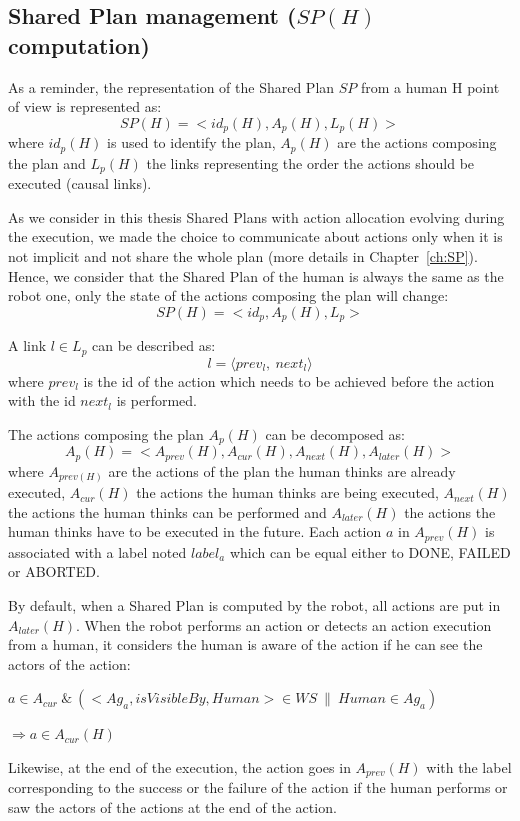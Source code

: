 \documentclass[english,a4paper,11pt,twoside]{StyleThese}
\begin{document}
\subsection{Shared Plan management ($SP(H)$ computation)}

As a reminder, the representation of the Shared Plan $SP$ from a human H point of view is represented as:
$$SP(H) = <id_p(H), A_p(H), L_p(H)>$$
where $id_p(H)$ is used to identify the plan, $A_p(H)$ are the actions composing the plan and $L_p(H)$ the links representing the order the actions should be executed (causal links).

As we consider in this thesis Shared Plans with action allocation evolving during the execution, we made the choice to communicate about actions only when it is not implicit and not share the whole plan (more details in Chapter~\ref{ch:SP}). Hence, we consider that the Shared Plan of the human is always the same as the robot one, only the state of the actions composing the plan will change:
$$SP(H) = <id_p, A_p(H), L_p>$$

A link $l \in L_p$ can be described as:
 $$l = \langle prev_l, \ next_l \rangle$$
where $prev_l$ is the id of the action which needs to be achieved before the action with the id $next_l$ is performed. 

The actions composing the plan $A_p(H)$ can be decomposed as:
$$A_p(H) = <A_{prev}(H), A_{cur}(H), A_{next}(H), A_{later}(H)>$$
where $A_{prev(H)}$ are the actions of the plan the human thinks are already executed, $A_{cur}(H)$ the actions the human thinks are being executed, $A_{next}(H)$ the actions the human thinks can be performed and $A_{later}(H)$ the actions the human thinks have to be executed in the future. Each action $a$ in $A_{prev}(H)$ is associated with a label noted $label_a$ which can be equal either to DONE, FAILED or ABORTED.

By default, when a Shared Plan is computed by the robot, all actions are put in $A_{later}(H)$. When the robot performs an action or detects an action execution from a human, it considers the human is aware of the action if he can see the actors of the action:

\begin{center}
$a \in A_{cur} \ \& \ (<Ag_a, isVisibleBy, Human> \in WS \ \| \ Human \in Ag_a)$ 

$\Rightarrow a \in A_{cur}(H)$
\end{center}

Likewise, at the end of the execution, the action goes in $A_{prev}(H)$ with the label corresponding to the success or the failure of the action if the human performs or saw the actors of the actions at the end of the action.
\end{document}
